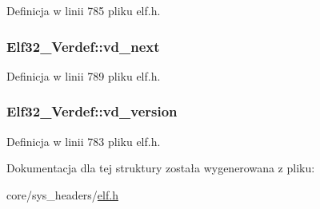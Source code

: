 Definicja w linii 785 pliku elf.\-h.

\hypertarget{struct_elf32___verdef_ac919bdca49dff2f3a04b1328903edb71}{
\subsubsection[{vd\-\_\-next}]{ Elf32\-\_\-\-Verdef\-::vd\-\_\-next}}\label{struct_elf32___verdef_ac919bdca49dff2f3a04b1328903edb71}


Definicja w linii 789 pliku elf.\-h.

\hypertarget{struct_elf32___verdef_ad2f222a352ff9e2d92199811ff094822}{
\subsubsection[{vd\-\_\-version}]{ Elf32\-\_\-\-Verdef\-::vd\-\_\-version}}\label{struct_elf32___verdef_ad2f222a352ff9e2d92199811ff094822}


Definicja w linii 783 pliku elf.\-h.



Dokumentacja dla tej struktury została wygenerowana z pliku\-:\begin{DoxyCompactItemize}
\item 
core/sys\-\_\-headers/\hyperlink{elf_8h}{elf.\-h}\end{DoxyCompactItemize}
